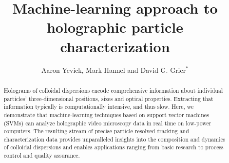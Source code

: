\documentclass[10pt,letterpaper]{article}
\begin{document}
\title{Machine-learning approach to holographic particle characterization}

\author{Aaron Yevick, Mark Hannel and David G. Grier$^\ast$}

\address{Department of Physics and Center for Soft Matter Research,
New York University, New York, NY 10003, USA}


\begin{abstract}
Holograms of colloidal dispersions encode comprehensive 
information about individual particles' three-dimensional
positions, sizes and optical properties.
Extracting that information typically is computationally
intensive, and thus slow.
Here, we demonstrate that machine-learning techniques
based on support vector machines (SVMs) can analyze
holographic video microscopy data in real time on
low-power computers.
The resulting stream of precise particle-resolved
tracking and characterization data provides unparalleled
insights into the composition and dynamics of colloidal
dispersions and enables applications ranging from
basic research to process control and quality assurance.
\end{abstract}

\end{document}
